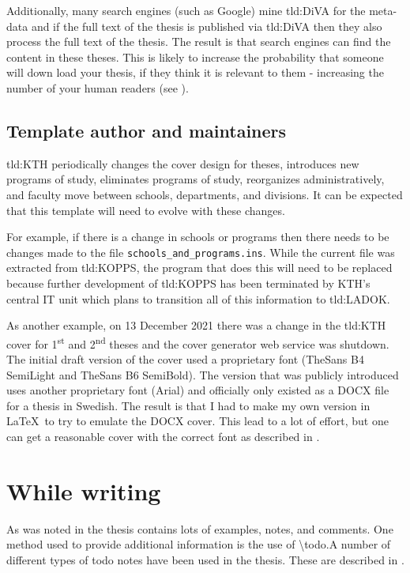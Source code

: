 Additionally, many search engines (such as Google) mine \gls{tld:DiVA} for the meta-data and if the full text of the thesis is published via \gls{tld:DiVA} then they also process the full text of the thesis. The result is that search engines can find the content in these theses.  This is likely to increase the probability that someone will down load your thesis, if they think it is relevant to them - increasing the number of your human readers (see ).

\subsection{Template author and maintainers}
\label{sec:maintainer}

\gls{tld:KTH} periodically changes the cover design for theses, introduces new programs of study, eliminates programs of study, reorganizes administratively,
and faculty move between schools, departments, and divisions. It can be expected that this template will need to evolve with these changes.

For example, if there is a change in schools or programs then there needs to be changes made to the file \texttt{schools\_and\_programs.ins}. While the current file was extracted from \gls{tld:KOPPS}, the program that does this will need to be replaced because further development of \gls{tld:KOPPS} has been terminated by KTH's central IT unit which plans to transition all of this information to \gls{tld:LADOK}.

As another example, on 13 December 2021 there was a change in the \gls{tld:KTH} cover for 1\textsuperscript{st} and 2\textsuperscript{nd} theses and the cover generator web service was shutdown. The initial draft version of the cover used a proprietary font (TheSans B4 SemiLight and TheSans B6 SemiBold). The version that was publicly introduced uses another proprietary font (Arial) and officially only existed as a DOCX file for a thesis in Swedish. The result is that I had to make my own version in \LaTeX\ to try to emulate the DOCX cover. This lead to a lot of effort, but one can get a reasonable cover with the correct font as described in .

\section{While writing}
As was noted in  the thesis contains lots of examples, notes, and comments. One method used to provide additional information is the use of \textbackslash todo.A number of different types of todo notes have been used in the thesis. These are described in .

